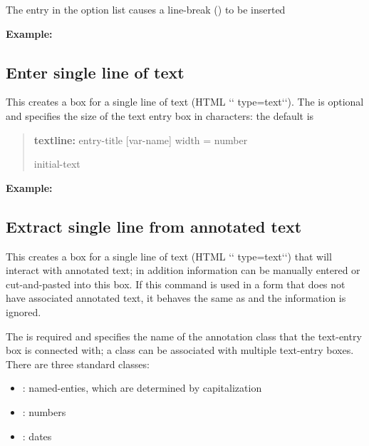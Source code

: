 \documentclass[letterpaper,10pt,english]{sphinxmanual}
\begin{document}
The entry \code{/} in the option list causes a line-break () to be
inserted

\textbf{Example:}
\begin{quote}

\end{quote}


\subsection{Enter single line of text}
\label{forms:enter-single-line-of-text}
This creates a box for a single line of text (HTML {}`{}` type=text{}`{}`). The
 is optional and specifies the size of the text entry
box in characters: the default is 
\begin{quote}

\begin{DUlineblock}{0em}
\item[] \textbf{textline:} entry-title {[}var-name{]} width = number
\item[] initial-text
\end{DUlineblock}
\end{quote}

\textbf{Example:}
\begin{quote}

\end{quote}


\subsection{Extract single line from annotated text}
\label{forms:extract-single-line-from-annotated-text}
This creates a box for a single line of text (HTML {}`{}` type=text{}`{}`) that
will interact with annotated text; in addition information can be
manually entered or cut-and-pasted into this box. If this command is
used in a form that does not have associated annotated text, it behaves
the same as  and the  information is ignored.

The  is required and specifies the name of the
annotation class that the text-entry box is connected with; a class can
be associated with multiple text-entry boxes. There are three standard
classes:
\begin{itemize}
\item {} 
: named-enties, which are determined by capitalization

\item {} 
: numbers

\item {} 
: dates

\end{itemize}
\end{document}
